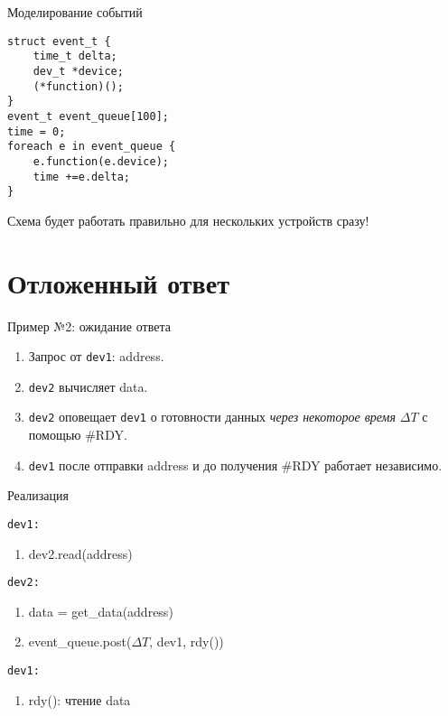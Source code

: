 \documentclass{beamer}
\begin{document}
\begin{frame}[fragile]{Моделирование событий}
\begin{verbatim}
struct event_t {
    time_t delta;
    dev_t *device;
    (*function)();
}
event_t event_queue[100];
time = 0;
foreach e in event_queue {
    e.function(e.device);
    time +=e.delta;
}
\end{verbatim}

Схема будет работать правильно для нескольких устройств сразу!

\end{frame}

\section{Отложенный ответ}

\begin{frame}{Пример №2: ожидание ответа}

\begin{center}
                 \end{center}

\begin{enumerate}
    \item Запрос от \texttt{dev1}: address.
    \item \texttt{dev2} вычисляет data.
    \item \texttt{dev2} оповещает \texttt{dev1} о готовности данных \textit{через некоторое время} $\Delta T$ с помощью \#RDY.
    \item \texttt{dev1} после отправки address и до получения \#RDY работает независимо.
\end{enumerate}

\end{frame}

\begin{frame}{Реализация}

\texttt{dev1:}
\begin{enumerate}
    \item dev2.read(address)
\end{enumerate}
\texttt{dev2:}
\begin{enumerate}
    \item data = get_data(address)
    \item event_queue.post($\Delta T$, dev1, rdy())
\end{enumerate}
\texttt{dev1:}
\begin{enumerate}
    \item rdy(): чтение data
\end{enumerate}

\end{frame}
\end{document}
